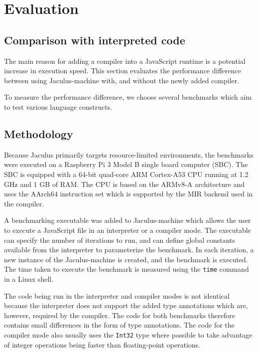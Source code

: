 \chapter{Evaluation}

\section{Comparison with interpreted code}

The main reason for adding a compiler into a JavaScript runtime is a potential increase in execution speed. This section evaluates the performance difference between using Jaculus-machine with, and without the newly added compiler.

To measure the performance difference, we choose several benchmarks which aim to test various language constructs.

\section{Methodology}

Because Jaculus primarily targets resource-limited environments, the benchmarks were executed on a Raspberry Pi 3 Model B\cite{rpi3b_product} single board computer (SBC). The SBC is equipped with a 64-bit quad-core ARM Cortex-A53 CPU running at 1.2 GHz and 1 GB of RAM. The CPU is based on the ARMv8-A architecture and uses the AArch64 instruction set which is supported by the MIR backend used in the compiler.

A benchmarking executable was added to Jaculus-machine which allows the user to execute a JavaScript file in an interpreter or a compiler mode. The executable can specify the number of iterations to run, and can define global constants available from the interpreter to parameterize the benchmark. In each iteration, a new instance of the Jaculus-machine is created, and the benchmark is executed. The time taken to execute the benchmark is measured using the \texttt{time} command in a Linux shell.

The code being run in the interpreter and compiler modes is not identical because the interpreter does not support the added type annotations which are, however, required by the compiler. The code for both benchmarks therefore contains small differences in the form of type annotations. The code for the compiler mode also usually uses the \texttt{Int32} type where possible to take advantage of integer operations being faster than floating-point operations.

